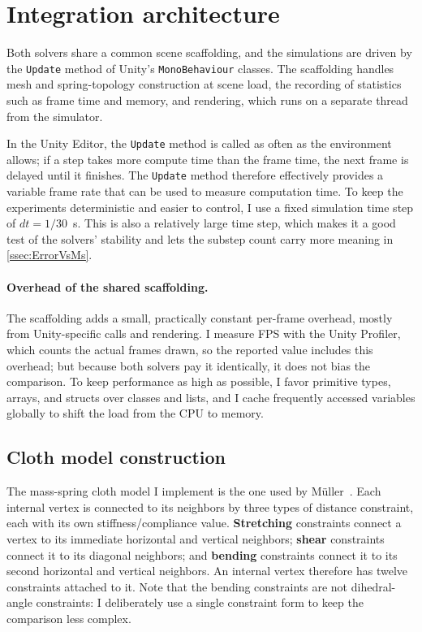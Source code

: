 \section{Integration architecture}
\label{sec:Architecture}
Both solvers share a common scene scaffolding, and the simulations are driven by
the \texttt{Update} method of Unity's \texttt{MonoBehaviour} classes. The
scaffolding handles mesh and spring-topology construction at scene load, the
recording of statistics such as frame time and memory, and rendering, which runs
on a separate thread from the simulator.

In the Unity Editor, the \texttt{Update} method is called as often as the
environment allows; if a step takes more compute time than the frame time, the
next frame is delayed until it finishes. The \texttt{Update} method therefore
effectively provides a variable frame rate that can be used to measure
computation time. To keep the experiments deterministic and easier to control, I
use a fixed simulation time step of $dt = 1/30$~s. This is also a relatively large
time step, which makes it a good test of the solvers' stability and lets the
substep count carry more meaning in \autoref{ssec:ErrorVsMs}.

\paragraph{Overhead of the shared scaffolding.}
The scaffolding adds a small, practically constant per-frame overhead, mostly from
Unity-specific calls and rendering. I measure FPS with the Unity Profiler, which
counts the actual frames drawn, so the reported value includes this overhead; but
because both solvers pay it identically, it does not bias the comparison. To keep
performance as high as possible, I favor primitive types, arrays, and structs over
classes and lists, and I cache frequently accessed variables globally to shift the
load from the CPU to memory.

\subsection{Cloth model construction}
\label{ssec:ClothModel}
The mass-spring cloth model I implement is the one used by
M\"uller~\cite{tenMinutePhysics}. Each internal vertex is connected to its
neighbors by three types of distance constraint, each with its own
stiffness/compliance value. \textbf{Stretching} constraints connect a vertex to
its immediate horizontal and vertical neighbors; \textbf{shear} constraints
connect it to its diagonal neighbors; and \textbf{bending} constraints connect it
to its second horizontal and vertical neighbors. An internal vertex therefore has
twelve constraints attached to it. Note that the bending constraints are not
dihedral-angle constraints: I deliberately use a single constraint form to keep
the comparison less complex.

